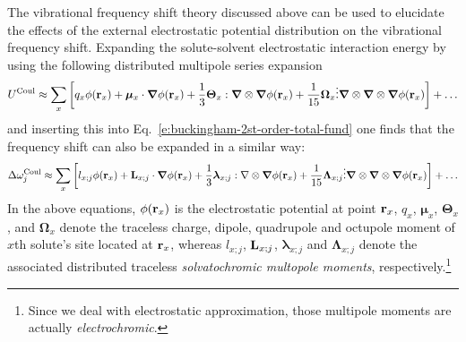 \documentclass[a4paper,titlepage,twoside,fleqn,12pt]{book}
\newcommand{\BM}[1]{\bm{#1}}
\begin{document}
\begin{refsection}
The vibrational frequency shift theory discussed above 
can be used
to elucidate the effects of the external electrostatic 
potential distribution on the vibrational frequency shift.
Expanding the solute-solvent electrostatic interaction energy by using the
following distributed multipole series 
expansion\citep{Stone.TheTheoryOfIntermolecularForces.1996}
%
\begin{equation} \label{e:dmtp}
 U^{\rm Coul} \approx  \sum_x \left[ q_x \phi({\bf r}_x) + 
                  {\BM \mu}_x \cdot {\BM \nabla} \phi({\bf r}_x)   + 
      \frac{1}{3} {\BM \Theta}_x : {\BM \nabla} \otimes {\BM \nabla} \phi({\bf r}_x)   + 
     \frac{1}{15} {\BM \Omega}_x \vdots {\BM \nabla} \otimes {\BM \nabla} \otimes {\BM \nabla} \phi({\bf r}_x) \right] + \ldots
\end{equation}
%
and inserting this into Eq.~\eqref{e:buckingham-2st-order-total-fund} 
one finds that the frequency shift can also be expanded
in a similar way\citep{Cho.JCP.2009}:
%
\begin{equation} \label{e:dmtp-sol}
 \Delta\omega_j^{\rm Coul} \approx  \sum_x \left[ l_{x;j} \phi({\bf r}_x) + 
                        {\bf L}_{x;j} \cdot {\BM \nabla} \phi({\bf r}_x)   + 
      \frac{1}{3} {\BM \lambda}_{x;j} : {\bf \nabla} \otimes {\BM \nabla} \phi({\bf r}_x)   + 
     \frac{1}{15} {\BM \Lambda}_{x;j} \vdots {\BM \nabla} \otimes {\BM \nabla} \otimes {\BM \nabla} \phi({\bf r}_x) \right] + \ldots
\end{equation}
%
In the above equations, $\phi({\bf r}_x)$ is the electrostatic
potential at point ${\bf r}_x$,
$q_x$, ${\BM \mu}_x$, ${\BM \Theta}_x$, and ${\BM \Omega}_x$ 
denote the traceless charge, dipole, quadrupole and octupole moment 
of $x$th solute's site located at ${\bf r}_x$, whereas 
$l_{x;j}$, ${\bf L}_{x;j}$, ${\BM \lambda}_{x;j}$ and ${\BM \Lambda}_{x;j}$ 
denote the associated distributed traceless
\emph{solvatochromic multopole moments}, respectively.\footnote{Since we deal with 
electrostatic approximation, those multipole moments are actually \emph{electrochromic}.}


\end{refsection}
\end{document}
